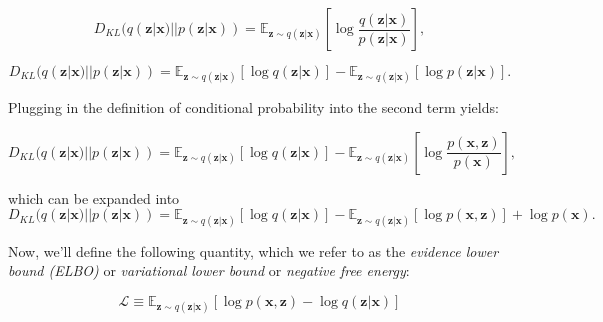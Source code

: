  \begin{equation}
 	D_{KL}(q (\mathbf{z} | \mathbf{x}) || p (\mathbf{z} | \mathbf{x})) = \mathbb{E}_{\mathbf{z} \sim q (\mathbf{z} | \mathbf{x})} \left[ \log \frac{q (\mathbf{z} | \mathbf{x})}{p (\mathbf{z} | \mathbf{x})} \right],
	\label{eq: elbo derivation 1}
 \end{equation}
 
 
 \begin{equation}
 	D_{KL}(q (\mathbf{z} | \mathbf{x}) || p (\mathbf{z} | \mathbf{x})) = \mathbb{E}_{\mathbf{z} \sim q (\mathbf{z} | \mathbf{x})} \left[ \log q (\mathbf{z} | \mathbf{x}) \right] - \mathbb{E}_{\mathbf{z} \sim q (\mathbf{z} | \mathbf{x})} \left[ \log p (\mathbf{z} | \mathbf{x}) \right].
	\label{eq: elbo derivation 2}
 \end{equation}
 
 \noindent Plugging in the definition of conditional probability into the second term yields:
 
  \begin{equation}
 	D_{KL}(q (\mathbf{z} | \mathbf{x}) || p (\mathbf{z} | \mathbf{x})) = \mathbb{E}_{\mathbf{z} \sim q (\mathbf{z} | \mathbf{x})} \left[ \log q (\mathbf{z} | \mathbf{x}) \right] - \mathbb{E}_{\mathbf{z} \sim q (\mathbf{z} | \mathbf{x})} \left[ \log \frac{p (\mathbf{x}, \mathbf{z})}{p (\mathbf{x})} \right],
	\label{eq: elbo derivation 3}
 \end{equation}
 
 \noindent which can be expanded into
 \begin{equation}
 	D_{KL}(q (\mathbf{z} | \mathbf{x}) || p (\mathbf{z} | \mathbf{x})) = \mathbb{E}_{\mathbf{z} \sim q (\mathbf{z} | \mathbf{x})} \left[ \log q (\mathbf{z} | \mathbf{x}) \right] - \mathbb{E}_{\mathbf{z} \sim q (\mathbf{z} | \mathbf{x})} \left[ \log p (\mathbf{x}, \mathbf{z}) \right] + \log p (\mathbf{x}).
	\label{eq: elbo derivation 4}
 \end{equation}
 
 \noindent Now, we'll define the following quantity, which we refer to as the \textit{evidence lower bound (ELBO)} or \textit{variational lower bound} or \textit{negative free energy}:
 
\begin{equation}
 	\boxed{\mathcal{L} \equiv \mathbb{E}_{\mathbf{z} \sim q (\mathbf{z} | \mathbf{x})} \left[ \log p (\mathbf{x}, \mathbf{z}) - \log q (\mathbf{z} | \mathbf{x}) \right]}
	\label{eq: elbo derivation 5}
\end{equation}

